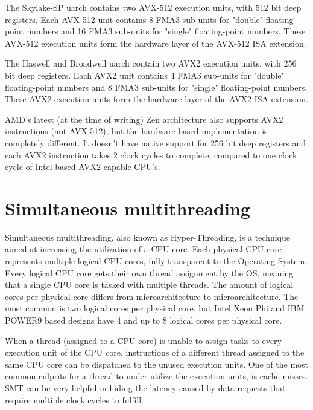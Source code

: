 The Skylake-SP uarch contains two AVX-512 execution units, with 512 bit deep registers. Each AVX-512 unit contains 8 FMA3 sub-units for "double" floating-point numbers and 16 FMA3 sub-units for "single" floating-point numbers. These AVX-512 execution units form the hardware layer of the AVX-512 ISA extension\autocite[]{wiki_avx512}.\vspace{5mm}

The Haswell and Broadwell uarch contain two AVX2 execution units, with 256 bit deep registers. Each AVX2 unit contains 4 FMA3 sub-units for "double" floating-point numbers and 8 FMA3 sub-units for "single" floating-point numbers. These AVX2 execution units form the hardware layer of the AVX2 ISA extension\autocite[]{wiki_avx2}.\vspace{5mm}

AMD's latest (at the time of writing) Zen architecture also supports AVX2 instructions (not AVX-512), but the hardware based implementation is completely different. It doesn't have native support for 256 bit deep registers and each AVX2 instruction takes 2 clock cycles to complete, compared to one clock cycle of Intel based AVX2 capable CPU's.

\section{Simultaneous multithreading}

\hspace{4mm}Simultaneous multithreading, also known as Hyper-Threading\autocite[]{wiki_ht}, is a technique aimed at increasing the utilization of a CPU core. Each physical CPU core represents multiple logical CPU cores, fully transparent to the Operating System. Every logical CPU core gets their own thread assignment by the OS, meaning that a single CPU core is tasked with multiple threads. The amount of logical cores per physical core differs from microarchitecture to microarchitecture. The most common is two logical cores per physical core, but Intel Xeon Phi\autocite[]{wiki_phi} and IBM POWER9\autocite[]{wiki_p9} based designs have 4 and up to 8 logical cores per physical core.\vspace{5mm}

When a thread (assigned to a CPU core) is unable to assign tasks to every execution unit of the CPU core, instructions of a different thread assigned to the same CPU core can be dispatched to the unused execution units. One of the most common culprits for a thread to under utilize the execution units, is cache misses. SMT can be very helpful in hiding the latency caused by data requests that require multiple clock cycles to fulfill.\vspace{5mm}

